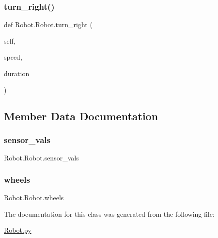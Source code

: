 \subsubsection{\texorpdfstring{turn\+\_\+right()}{turn\_right()}}
{\footnotesize\ttfamily def Robot.\+Robot.\+turn\+\_\+right (\begin{DoxyParamCaption}\item[{}]{self,  }\item[{}]{speed,  }\item[{}]{duration }\end{DoxyParamCaption})}



\subsection{Member Data Documentation}
\mbox{\label{class_robot_1_1_robot_a0d2df6b5b1ee9236e08f51468a22398d}} 
\subsubsection{\texorpdfstring{sensor\+\_\+vals}{sensor\_vals}}
{\footnotesize\ttfamily Robot.\+Robot.\+sensor\+\_\+vals}

\mbox{\label{class_robot_1_1_robot_ac0e3d996cf1764a2b968186444554312}} 
\subsubsection{\texorpdfstring{wheels}{wheels}}
{\footnotesize\ttfamily Robot.\+Robot.\+wheels}



The documentation for this class was generated from the following file\+:\begin{DoxyCompactItemize}
\item 
\mbox{\hyperlink{_robot_8py}{Robot.\+py}}\end{DoxyCompactItemize}
